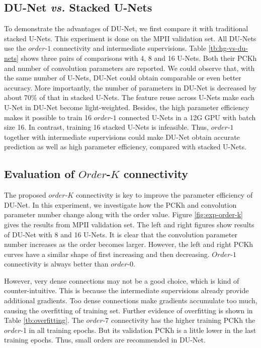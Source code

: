 \documentclass[runningheads]{llncs}
\begin{document}
\subsection{DU-Net {\it vs.} Stacked U-Nets}
To demonstrate the advantages of DU-Net, we first compare it with traditional stacked U-Nets. This experiment is done on the MPII validation set. All DU-Nets use the $order$-$1$ connectivity and intermediate supervisions. Table \ref{tb:hg-vs-du-nets} shows three pairs of comparisons with 4, 8 and 16 U-Nets. Both their PCKh and number of convolution parameters are reported. We could observe that, with the same number of U-Nets, DU-Net could obtain comparable or even better accuracy. More importantly, the number of parameters in DU-Net is decreased by about 70\% of that in stacked U-Nets. The feature reuse across U-Nets make each U-Net in DU-Net become light-weighted. Besides, the high parameter efficiency makes it possible to train 16 $order$-$1$ connected U-Nets in a 12G GPU with batch size 16. In contrast, training 16 stacked U-Nets is infeasible. Thus, $order$-$1$ together with intermediate supervisions could make DU-Net obtain accurate prediction as well as high parameter efficiency, compared with stacked U-Nets.




\subsection{Evaluation of $Order$-$K$ connectivity}
The proposed $order$-$K$ connectivity is key to improve the parameter efficiency of DU-Net. In this experiment, we investigate how the PCKh and convolution parameter number change along with the order value. Figure \ref{fig:exp-order-k} gives the results from MPII validation set. The left and right figures show results of DU-Net with 8 and 16 U-Nets. It is clear that the convolution parameter number increases as the order becomes larger. However, the left and right PCKh curves have a similar shape of first increasing and then decreasing. $Order$-$1$ connectivity is always better than $order$-$0$. 

However, very dense connections may not be a good choice, which is kind of counter-intuitive. This is because the intermediate supervisions already provide additional gradients. Too dense connections make gradients accumulate too much, causing the overfitting of training set. Further evidence of overfitting is shown in Table \ref{tb:overfitting}. The $order$-7 connectivity has the higher training PCKh the $order$-1 in all training epochs. But its validation PCKh is a little lower in the last training epochs. Thus, small orders are recommended in DU-Net.
\end{document}
